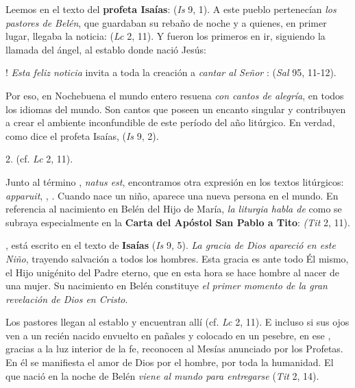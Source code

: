 \begin{body}
\begin{body}
		Leemos en el texto del \textbf{profeta Isaías}:  (\emph{Is} 9, 1). A este pueblo pertenecían \emph{los pastores de Belén}, que guardaban su rebaño de noche y a quienes, en primer lugar, llegaba la noticia:  (\emph{Lc} 2, 11). Y fueron los primeros en ir, siguiendo la llamada del ángel, al establo donde nació Jesús:

		! \emph{Esta feliz noticia} invita a toda la creación a \emph{cantar al Señor} :  (\emph{Sal} 95, 11-12).

		Por eso, en Nochebuena el mundo entero resuena \emph{con cantos de alegría}, en todos los idiomas del mundo. Son cantos que poseen un encanto singular y contribuyen a crear el ambiente inconfundible de este período del año litúrgico. En verdad, como dice el profeta Isaías,  (\emph{Is} 9, 2).

		2.  (cf. \emph{Lc} 2, 11).

		Junto al término , \emph{natus est}, encontramos otra expresión en los textos litúrgicos: \emph{apparuit}, , . Cuando nace un niño, aparece una nueva persona en el mundo. En referencia al nacimiento en Belén del Hijo de María, \emph{la liturgia habla de}  como se subraya especialmente en la \textbf{Carta del Apóstol San Pablo a Tito}:  \emph{(Tit} 2, 11).

		, está escrito en el texto de \textbf{Isaías} (\emph{Is} 9, 5). \emph{La gracia de Dios apareció en este Niño}, trayendo salvación a todos los hombres. Esta gracia es ante todo Él mismo, el Hijo unigénito del Padre eterno, que en esta hora se hace hombre al nacer de una mujer. Su nacimiento en Belén constituye \emph{el primer momento de la gran revelación de Dios en Cristo}.

		Los pastores llegan al establo y encuentran allí  (cf. \emph{Lc} 2, 11). E incluso si sus ojos ven a un recién nacido envuelto en pañales y colocado en un pesebre, en ese , gracias a la luz interior de la fe, reconocen al Mesías anunciado por los Profetas. En él se manifiesta el amor de Dios por el hombre, por toda la humanidad. El que nació en la noche de Belén \emph{viene al mundo para entregarse}  (\emph{Tit} 2, 14).


\end{body}
\end{body}
